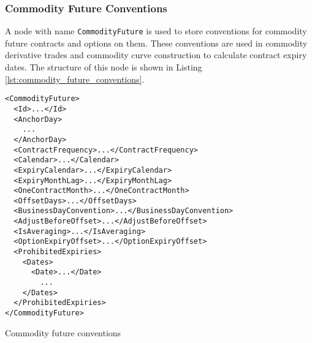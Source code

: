 \subsubsection{Commodity Future Conventions}
A node with name \lstinline!CommodityFuture! is used to store conventions for commodity future contracts and options on them. These conventions are used in commodity derivative trades and commodity curve construction to calculate contract expiry dates. The structure of this node is shown in Listing \ref{lst:commodity_future_conventions}.

\begin{listing}[h!]
\begin{verbatim}
<CommodityFuture>
  <Id>...</Id>
  <AnchorDay>
    ...
  </AnchorDay>
  <ContractFrequency>...</ContractFrequency>
  <Calendar>...</Calendar>
  <ExpiryCalendar>...</ExpiryCalendar>
  <ExpiryMonthLag>...</ExpiryMonthLag>
  <OneContractMonth>...</OneContractMonth>
  <OffsetDays>...</OffsetDays>
  <BusinessDayConvention>...</BusinessDayConvention>
  <AdjustBeforeOffset>...</AdjustBeforeOffset>
  <IsAveraging>...</IsAveraging>
  <OptionExpiryOffset>...</OptionExpiryOffset>
  <ProhibitedExpiries>
    <Dates>
      <Date>...</Date>
        ...
    </Dates>
  </ProhibitedExpiries>
</CommodityFuture>
\end{verbatim}
\caption{Commodity future conventions}
\label{lst:commodity_future_conventions}
\end{listing}

